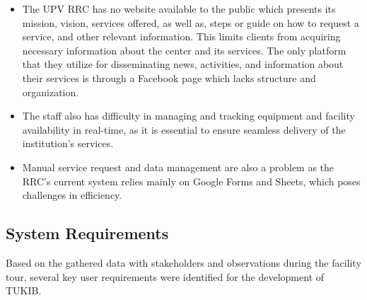 \begin{itemize}
	\item The UPV RRC has no website available to the public which presents its mission, vision, services offered, as well as, steps or guide on how to request a service, and other relevant information. This limits clients from acquiring necessary information about the center and its services. The only platform that they utilize for disseminating news, activities, and information about their services is through a Facebook page which lacks structure and organization.
	\item The staff also has difficulty in managing and tracking equipment and facility availability in real-time, as it is essential to ensure seamless delivery of the institution's services.
	\item Manual service request and data management are also a problem as the RRC’s current system relies mainly on Google Forms and Sheets, which poses challenges in efficiency.
\end{itemize}

\subsection{System Requirements}

Based on the gathered data with stakeholders and observations during the facility tour, several key user requirements were identified for the development of TUKIB. 


